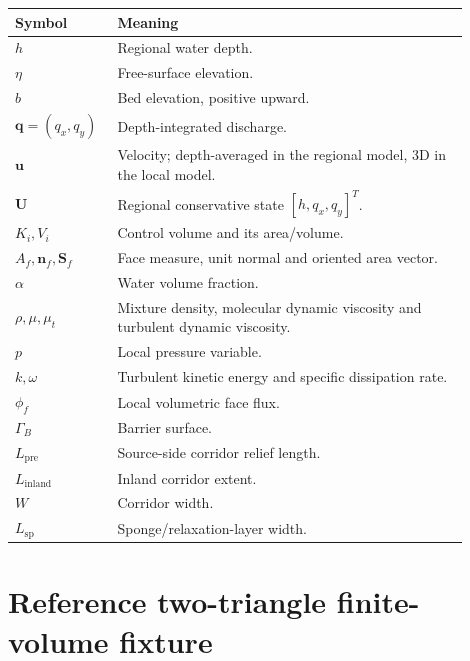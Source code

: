 \documentclass[11pt,a4paper]{article}
\newcommand{\vect}[1]{\bm{#1}}
\begin{document}
\begin{longtable}{p{0.18\linewidth}p{0.72\linewidth}}
\toprule
Symbol & Meaning\\
\midrule
$h$ & Regional water depth.\\
$\eta$ & Free-surface elevation.\\
$b$ & Bed elevation, positive upward.\\
$\vect q=(q_x,q_y)$ & Depth-integrated discharge.\\
$\vect u$ & Velocity; depth-averaged in the regional model, 3D in the local model.\\
$\vect U$ & Regional conservative state $[h,q_x,q_y]^T$.\\
$K_i,V_i$ & Control volume and its area/volume.\\
$A_f,\vect n_f,\vect S_f$ & Face measure, unit normal and oriented area vector.\\
$\alpha$ & Water volume fraction.\\
$\rho,\mu,\mu_t$ & Mixture density, molecular dynamic viscosity and turbulent dynamic viscosity.\\
$p$ & Local pressure variable.\\
$k,\omega$ & Turbulent kinetic energy and specific dissipation rate.\\
$\phi_f$ & Local volumetric face flux.\\
$\Gamma_B$ & Barrier surface.\\
$L_{\mathrm{pre}}$ & Source-side corridor relief length.\\
$L_{\mathrm{inland}}$ & Inland corridor extent.\\
$W$ & Corridor width.\\
$L_{\mathrm{sp}}$ & Sponge/relaxation-layer width.\\
\bottomrule
\end{longtable}

\section{Reference two-triangle finite-volume fixture}
\end{document}
